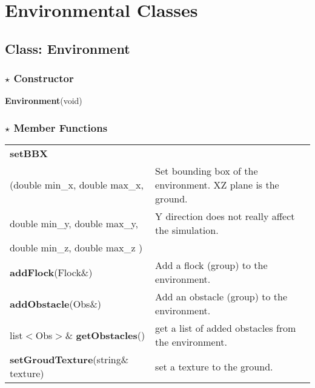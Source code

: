 \documentclass[onecolumn,10pt]{article}
\begin{document}

\section{Environmental Classes}
\label{sec:env}

\subsection{Class: Environment}

\subsubsection*{$\star$ Constructor}

{\bf Environment}(void)

\subsubsection*{$\star$ Member Functions}

\begin{tabular}{|l|l|}\hline
{\bf setBBX}   &  \\   %
        (double min\_x, double max\_x,    &  Set bounding box of the environment. XZ plane is the ground. \\
        double min\_y, double max\_y,     &  Y direction does not really affect the simulation. \\
	double min\_z, double max\_z )    &  \\\hline
{\bf addFlock}(Flock\&)                   & Add a flock (group) to the environment. \\\hline
{\bf addObstacle}(Obs\&)                  & Add an obstacle (group) to the environment.\\\hline
list$<$Obs$>$\& {\bf getObstacles}()          & get a list of added obstacles from the environment.\\\hline
{\bf setGroudTexture}(string\& texture)    & set a texture to the ground.\\\hline
\end{tabular}

\end{document}
